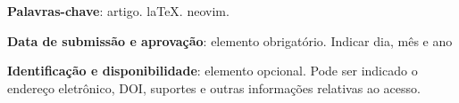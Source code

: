 \documentclass[article,a4paper,12pt,oneside,english,brazilian,sumario=tradicional]{abntex2}
\begin{document}
\frenchspacing 

\maketitle

\begin{resumoumacoluna}
    \lipsum[1]

    \vspace{\onelineskip}

    \noindent
    \textbf{Palavras-chave}: artigo. laTeX. neovim.
\end{resumoumacoluna}

%
%

\begin{center}
    \smaller
    \textbf{Data de submissão e aprovação}: elemento obrigatório. Indicar dia, mês e ano

    \textbf{Identificação e disponibilidade}: elemento opcional. Pode ser indicado 
    o endereço eletrônico, DOI, suportes e outras informações relativas ao acesso.
\end{center}

\textual







\postextual


\end{document}
